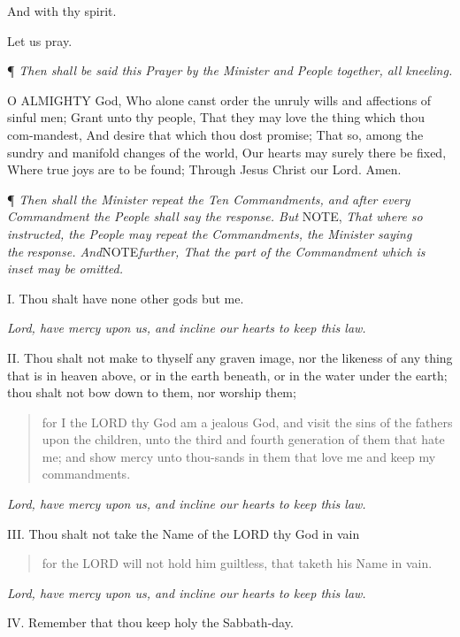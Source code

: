 And with thy spirit.

Let us
pray.

¶
\emph{Then shall be said this Prayer by the Minister and People together,
all kneeling.}

O
ALMIGHTY God, Who alone canst order the unruly wills and affections of
sinful men; Grant unto thy people, That they may love the thing which
thou com-mandest, And desire that which thou dost promise; That so, among
the sundry and manifold changes of the world, Our hearts may surely there
be fixed, Where true joys are to be found; Through Jesus Christ our Lord.
Amen. 

¶
\emph{Then shall the Minister repeat the Ten Commandments, and after every
Commandment the People shall say the response. But} NOTE,
\emph{That where so instructed, the People may repeat the Commandments,
the Minister saying theresponse. And}NOTE\emph{further, That the part of the Commandment which is inset may be omitted.}

I.
Thou shalt have none other gods but me.

\emph{Lord, have mercy upon us, and incline our hearts to keep this law.}

II. Thou shalt not make to thyself any graven image, nor the likeness
of any thing that is in heaven above, or in the earth beneath, or in the
water under the earth; thou shalt not bow down to them, nor worship them;

\begin{quote}

for
I the LORD thy God am a jealous God, and visit
the sins of the fathers upon the children, unto the third and fourth
generation of them that hate me; and show mercy unto thou-sands in them
that love me and keep my commandments.

\end{quote}

\emph{Lord, have mercy upon us, and incline our hearts to keep this law.}

III. Thou shalt not take the Name of the LORD thy
God in vain

\begin{quote}

for
the LORD will not hold him guiltless, that taketh
his Name in vain.

\end{quote}

\emph{Lord, have mercy upon us, and incline our hearts to keep this law.}

IV. Remember that thou keep holy the Sabbath-day.

